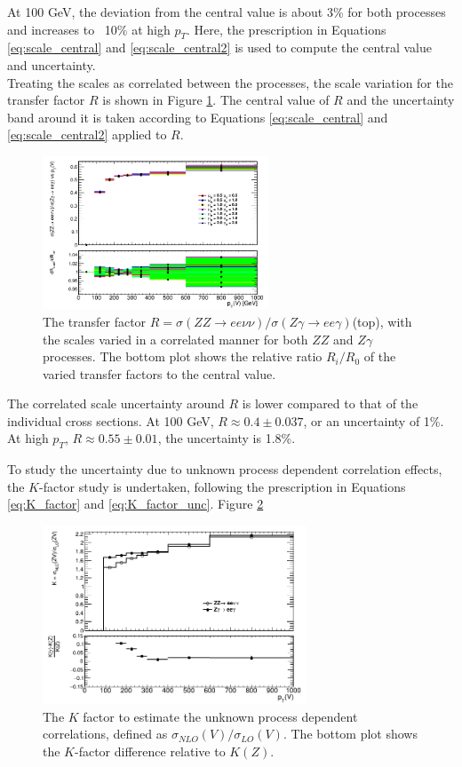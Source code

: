 \documentclass[11pt,a4paper,openright,twoside]{report}
\begin{document}
At 100 GeV, the deviation from the central value is about 3\% for both processes and increases to ~10\% at high $p_T$. Here, the prescription in Equations \ref{eq:scale_central} and \ref{eq:scale_central2} is used to compute the central value and uncertainty.\\ Treating the scales as correlated between the processes, the scale variation for the transfer factor $R$ is shown in Figure \ref{fig:R_scale}. The central value of $R$ and the uncertainty band around it is taken according to Equations \ref{eq:scale_central} and \ref{eq:scale_central2} applied to $R$.
\begin{figure}[H]
\centering
\includegraphics[width=0.6\textwidth]{R_scale.png}
\caption{The transfer factor $R = \sigma(ZZ\to ee\nu\nu)/\sigma(Z\gamma\to ee\gamma)$(top), with the scales varied in a correlated manner for both $ZZ$ and $Z\gamma$ processes. The bottom plot shows the relative ratio $R_i/R_0$ of the varied transfer factors to the central value.}
\label{fig:R_scale}
\end{figure}
The correlated scale uncertainty around $R$ is lower compared to that of the individual cross sections. At 100 GeV, $R \approx 0.4 \pm 0.037$, or an uncertainty of 1\%. At high $p_T$, $R\approx 0.55 \pm 0.01$, the uncertainty is 1.8\%.

To study the uncertainty due to unknown process dependent correlation effects, the $K$-factor study is undertaken, following the prescription in Equations \ref{eq:K_factor} and \ref{eq:K_factor_unc}. Figure \ref{fig:K_pt}
\begin{figure}[H]
\centering
	\includegraphics[width=0.7\textwidth]{K_pt.png}
	\caption{The $K$ factor to estimate the unknown process dependent correlations, defined as $\sigma_{NLO}(V)/\sigma_{LO}(V)$. The bottom plot shows the $K$-factor difference relative to $K(Z)$.}
	\label{fig:K_pt}
\end{figure}
\end{document}

